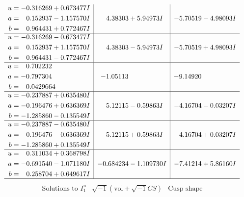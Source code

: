 \documentclass[1p]{elsarticle_modified}
\theoremstyle{definition}
\newcommand{\I}{\sqrt{-1}}
\begin{document}
$$\begin{array}{c|c|c}
\begin{aligned}
u &= -0.316269 + 0.673477 I \\
a &= \phantom{-}0.152937 - 1.157570 I \\
b &= \phantom{-}0.964431 + 0.772467 I\end{aligned}
 & \phantom{-}4.38303 + 5.94973 I & -5.70519 - 4.98093 I \\ \hline\begin{aligned}
u &= -0.316269 - 0.673477 I \\
a &= \phantom{-}0.152937 + 1.157570 I \\
b &= \phantom{-}0.964431 - 0.772467 I\end{aligned}
 & \phantom{-}4.38303 - 5.94973 I & -5.70519 + 4.98093 I \\ \hline\begin{aligned}
u &= \phantom{-}0.702232\phantom{ +0.000000I} \\
a &= -0.797304\phantom{ +0.000000I} \\
b &= \phantom{-}0.0429664\phantom{ +0.000000I}\end{aligned}
 & -1.05113\phantom{ +0.000000I} & -9.14920\phantom{ +0.000000I} \\ \hline\begin{aligned}
u &= -0.237887 + 0.635480 I \\
a &= -0.196476 + 0.636369 I \\
b &= -1.285860 - 0.135549 I\end{aligned}
 & \phantom{-}5.12115 - 0.59863 I & -4.16704 - 0.03207 I \\ \hline\begin{aligned}
u &= -0.237887 - 0.635480 I \\
a &= -0.196476 - 0.636369 I \\
b &= -1.285860 + 0.135549 I\end{aligned}
 & \phantom{-}5.12115 + 0.59863 I & -4.16704 + 0.03207 I \\ \hline\begin{aligned}
u &= \phantom{-}0.311034 + 0.368798 I \\
a &= -0.691540 - 1.071180 I \\
b &= \phantom{-}0.258704 + 0.649617 I\end{aligned}
 & -0.684234 - 1.109730 I & -7.41214 + 5.86160 I\\
 \hline 
 \end{array}$$\newpage$$\begin{array}{c|c|c}  
\text{Solutions to }I^u_{1}& \I (\text{vol} + \sqrt{-1}CS) & \text{Cusp shape}\\

\end{array}$$
\end{document}
